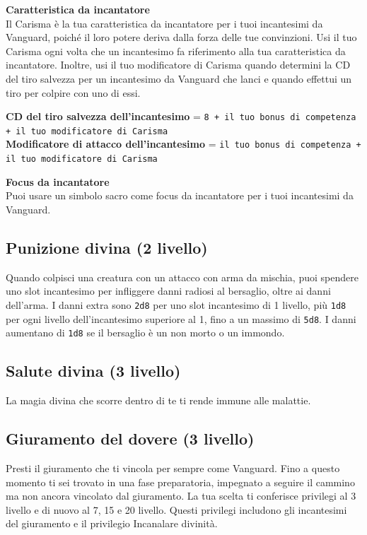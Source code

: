 \documentclass[a4paper,10pt,twoside,twocolumn,openany,bg=full,nodeprecatedcode]{dndbook}
\begin{document}
\textbf{Caratteristica da incantatore} \\ Il Carisma è la tua caratteristica da incantatore per i tuoi incantesimi da Vanguard, poiché il loro potere deriva dalla forza delle tue convinzioni. Usi il tuo Carisma ogni volta che un incantesimo fa riferimento alla tua caratteristica da incantatore. Inoltre, usi il tuo modificatore di Carisma quando determini la CD del tiro salvezza per un incantesimo da Vanguard che lanci e quando effettui un tiro per colpire con uno di essi.

\begin{DndReadAloud}[color=PhbLightCyan]
\textbf{CD del tiro salvezza dell'incantesimo} = \texttt{8 + il tuo bonus di competenza + il tuo modificatore di Carisma} \\ \textbf{Modificatore di attacco dell'incantesimo} = \texttt{il tuo bonus di competenza + il tuo modificatore di Carisma}

\end{DndReadAloud}

\textbf{Focus da incantatore} \\ Puoi usare un simbolo sacro come focus da incantatore per i tuoi incantesimi da Vanguard.

\subsection{Punizione divina (2\degree{} livello)}\label{Vanguard_divine_smite}
Quando colpisci una creatura con un attacco con arma da mischia, puoi spendere uno slot incantesimo per infliggere danni radiosi al bersaglio, oltre ai danni dell'arma. I danni extra sono \texttt{2d8} per uno slot incantesimo di 1\degree{} livello, più \texttt{1d8} per ogni livello dell'incantesimo superiore al 1\degree{}, fino a un massimo di \texttt{5d8}. I danni aumentano di \texttt{1d8} se il bersaglio è un non morto o un immondo.

\subsection{Salute divina (3\degree{} livello)}\label{Vanguard_divine_health}
La magia divina che scorre dentro di te ti rende immune alle malattie.

\subsection{Giuramento del dovere (3\degree{} livello)}\label{Vanguard_oath_of_duty}
Presti il giuramento che ti vincola per sempre come Vanguard. Fino a questo momento ti sei trovato in una fase preparatoria, impegnato a seguire il cammino ma non ancora vincolato dal giuramento. La tua scelta ti conferisce privilegi al 3\degree{} livello e di nuovo al 7\degree{}, 15\degree{} e 20\degree{} livello. Questi privilegi includono gli incantesimi del giuramento e il privilegio Incanalare divinità.
\end{document}

